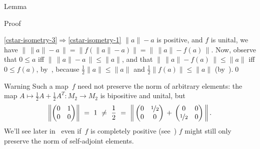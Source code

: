 \documentclass[a]{subfiles}
\begin{document}
\begin{parsec}
\begin{point}{Lemma}
\begin{point}{Proof}
\begin{point}{\ref{cstar-isometry-3}$\Longrightarrow$\ref{cstar-isometry-1}}
$\|a\|-a$ is positive,
and $f$ is unital,
we have $\|\,\|a\|-a\,\|=\|f(\|a\|-a)\|=\|\,\|a\|-f(a)\,\|$.
Now,
observe that
$0\leq a$
iff
$ \|\,\|a\|-a\,\|\leq \|a\|$,
and that
$\|\,\|a\|-f(a)\,\|\leq \|a\|$ 
iff $0\leq f(a)$,
by~,
because $\frac{1}{2}\|a\|\leq \|a\|$
and $\frac{1}{2}\|f(a)\|\leq  \|a\|$
(by~).\qed
\end{point}
\end{point}
\begin{point}{Warning}%
Such a map~$f$ need not preserve the norm of arbitrary elements:
the map $A\mapsto \frac{1}{2}A+\frac{1}{2}A^T\colon M_2\to M_2$
is bipositive and unital,
but
\begin{equation*}
\left\|\left(\begin{matrix}0&1\\0&0\end{matrix}
\right)\right\|
\ = \ 1 \ \neq \ \frac{1}{2}\ = \ 
\left\|\,\left(\begin{matrix}0 & \nicefrac{1}{2} \\ 0 & 0
\end{matrix}\right)
\,+\,\left(\begin{matrix}0 & 0\\ \nicefrac{1}{2} & 0
\end{matrix}\right)\,\right\|.
\end{equation*}
We'll see later in~\TODO{}
even if~$f$ is completely positive (see~)
$f$ might still only preserve the norm of self-adjoint elements.
\end{point}
\end{point}
\end{parsec}
\end{document}

